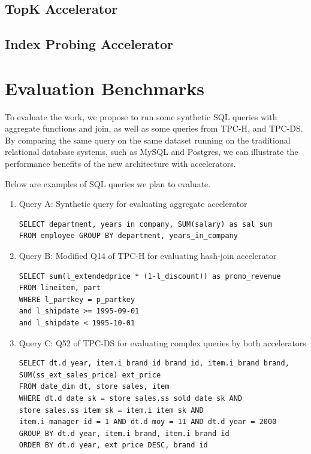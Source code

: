 \documentclass{article}
\begin{document}
\subsection{TopK Accelerator}

\subsection{Index Probing Accelerator}



\section{Evaluation Benchmarks}
\label{sec:eval}
To evaluate the work, we propose to run some synthetic SQL queries with aggregate functions and join, as well as some queries from TPC-H, and TPC-DS.
By comparing the same query on the same dataset running on the traditional relational database systems, such as MySQL and Postgres, we can illustrate the performance benefits of the new architecture with accelerators.

Below are examples of SQL queries we plan to evaluate.

\begin{enumerate}

\item Query A: Synthetic query for evaluating aggregate accelerator 
\begin{verbatim}
SELECT department, years in company, SUM(salary) as sal sum
FROM employee GROUP BY department, years_in_company
\end{verbatim}

\item Query B: Modified Q14 of TPC-H for evaluating hash-join accelerator
\begin{verbatim}
SELECT sum(l_extendedprice * (1-l_discount)) as promo_revenue
FROM lineitem, part
WHERE l_partkey = p_partkey
and l_shipdate >= 1995-09-01 
and l_shipdate < 1995-10-01
\end{verbatim}

\item Query C: Q52 of TPC-DS for evaluating complex queries by both accelerators
\begin{verbatim}
SELECT dt.d_year, item.i_brand_id brand_id, item.i_brand brand,
SUM(ss_ext_sales_price) ext_price
FROM date_dim dt, store sales, item
WHERE dt.d date sk = store sales.ss sold date sk AND
store sales.ss item sk = item.i item sk AND
item.i manager id = 1 AND dt.d moy = 11 AND dt.d year = 2000
GROUP BY dt.d year, item.i brand, item.i brand id
ORDER BY dt.d year, ext price DESC, brand id
\end{verbatim}
\end{enumerate}



\end{document}
